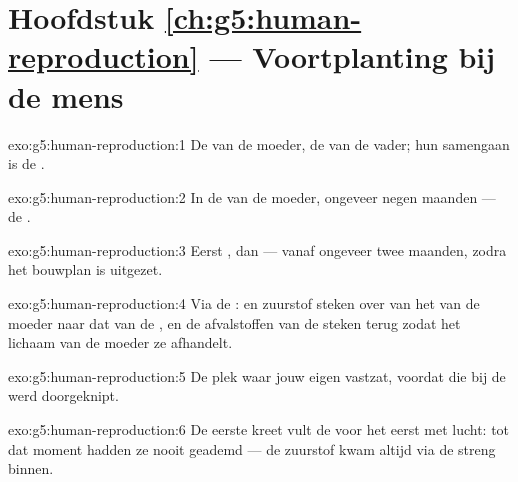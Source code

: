 \section*{Hoofdstuk \ref{ch:g5:human-reproduction} --- Voortplanting bij de mens}

\begin{solution}{exo:g5:human-reproduction:1}
De  van de moeder, de  van de vader; hun samengaan is de
.
\end{solution}

\begin{solution}{exo:g5:human-reproduction:2}
In de  van de moeder, ongeveer negen maanden --- de .
\end{solution}

\begin{solution}{exo:g5:human-reproduction:3}
Eerst , dan  --- vanaf ongeveer twee maanden, zodra het
bouwplan is uitgezet.
\end{solution}

\begin{solution}{exo:g5:human-reproduction:4}
Via de :  en zuurstof steken over van het
 van de moeder naar dat van de , en de afvalstoffen van de 
steken terug zodat het lichaam van de moeder ze afhandelt.
\end{solution}

\begin{solution}{exo:g5:human-reproduction:5}
De plek waar jouw eigen  vastzat, voordat die bij de 
werd doorgeknipt.
\end{solution}

\begin{solution}{exo:g5:human-reproduction:6}
De eerste kreet vult de  voor het eerst met lucht: tot dat moment
hadden ze nooit geademd --- de zuurstof kwam altijd via de streng binnen.
\end{solution}

